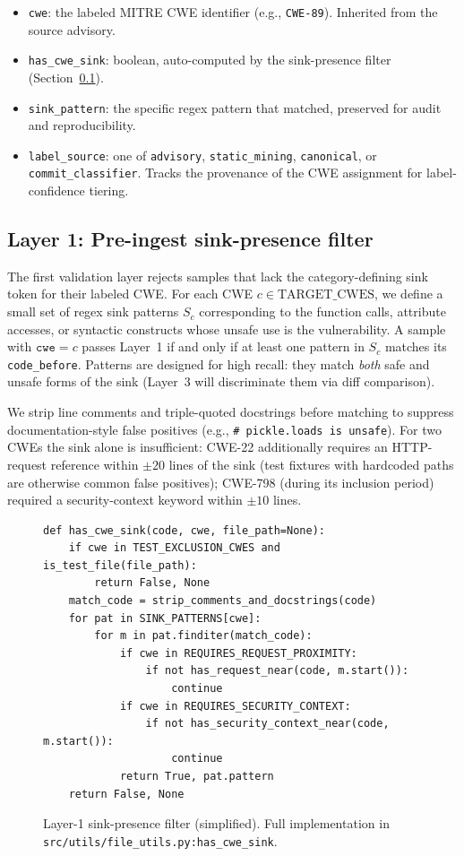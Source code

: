 \begin{itemize}
\item \texttt{cwe}: the labeled MITRE CWE identifier (e.g.,
  \texttt{CWE-89}). Inherited from the source advisory.
\item \texttt{has\_cwe\_sink}: boolean, auto-computed by the
  sink-presence filter (Section~\ref{sec:dataset:sink}).
\item \texttt{sink\_pattern}: the specific regex pattern that matched,
  preserved for audit and reproducibility.
\item \texttt{label\_source}: one of \texttt{advisory},
  \texttt{static\_mining}, \texttt{canonical}, or
  \texttt{commit\_classifier}. Tracks the provenance of the CWE
  assignment for label-confidence tiering.
\end{itemize}

\subsection{Layer 1: Pre-ingest sink-presence filter}
\label{sec:dataset:sink}

The first validation layer rejects samples that lack the
category-defining sink token for their labeled CWE. For each CWE
$c \in \text{TARGET\_CWES}$, we define a small set of regex sink
patterns $S_c$ corresponding to the function calls, attribute
accesses, or syntactic constructs whose unsafe use is the
vulnerability. A sample with $\texttt{cwe} = c$ passes Layer~1 if
and only if at least one pattern in $S_c$ matches its
\texttt{code\_before}. Patterns are designed for high recall: they
match \emph{both} safe and unsafe forms of the sink (Layer~3 will
discriminate them via diff comparison).

We strip line comments and triple-quoted docstrings before matching
to suppress documentation-style false positives (e.g.,
\texttt{\# pickle.loads is unsafe}). For two CWEs the sink alone is
insufficient: CWE-22 additionally requires an HTTP-request reference
within $\pm 20$ lines of the sink (test fixtures with hardcoded paths
are otherwise common false positives); CWE-798 (during its inclusion
period) required a security-context keyword within $\pm 10$ lines.

\begin{figure}[h]
\begin{verbatim}
def has_cwe_sink(code, cwe, file_path=None):
    if cwe in TEST_EXCLUSION_CWES and is_test_file(file_path):
        return False, None
    match_code = strip_comments_and_docstrings(code)
    for pat in SINK_PATTERNS[cwe]:
        for m in pat.finditer(match_code):
            if cwe in REQUIRES_REQUEST_PROXIMITY:
                if not has_request_near(code, m.start()):
                    continue
            if cwe in REQUIRES_SECURITY_CONTEXT:
                if not has_security_context_near(code, m.start()):
                    continue
            return True, pat.pattern
    return False, None
\end{verbatim}
\caption{Layer-1 sink-presence filter (simplified). Full implementation
in \texttt{src/utils/file\_utils.py:has\_cwe\_sink}.}
\label{fig:sink-filter}
\end{figure}

